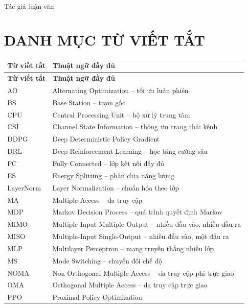 \vspace{1.2cm}
\begin{flushright}
Tác giả luận văn\\[2.2cm]
\AuthorName
\end{flushright}

\clearpage
\tableofcontents
\clearpage
\listoftables
\clearpage
\listoffigures
\clearpage

\chapter*{DANH MỤC TỪ VIẾT TẮT}
\begin{longtable}{p{2.4cm}p{11.7cm}}
\toprule
\textbf{Từ viết tắt} & \textbf{Thuật ngữ đầy đủ}\tabularnewline
\midrule
\endfirsthead
\toprule
\textbf{Từ viết tắt} & \textbf{Thuật ngữ đầy đủ}\tabularnewline
\midrule
\endhead
AO & Alternating Optimization -- tối ưu luân phiên\\
BS & Base Station -- trạm gốc\\
CPU & Central Processing Unit -- bộ xử lý trung tâm\\
CSI & Channel State Information -- thông tin trạng thái kênh\\
DDPG & Deep Deterministic Policy Gradient\\
DRL & Deep Reinforcement Learning -- học tăng cường sâu\\
FC & Fully Connected -- lớp kết nối đầy đủ\\
ES & Energy Splitting -- phân chia năng lượng\\
LayerNorm & Layer Normalization -- chuẩn hóa theo lớp\\
MA & Multiple Access -- đa truy cập\\
MDP & Markov Decision Process -- quá trình quyết định Markov\\
MIMO & Multiple-Input Multiple-Output -- nhiều đầu vào, nhiều đầu ra\\
MISO & Multiple-Input Single-Output -- nhiều đầu vào, một đầu ra\\
MLP & Multilayer Perceptron -- mạng truyền thẳng nhiều lớp\\
MS & Mode Switching -- chuyển đổi chế độ\\
NOMA & Non-Orthogonal Multiple Access -- đa truy cập phi trực giao\\
OMA & Orthogonal Multiple Access -- đa truy cập trực giao\\
PPO & Proximal Policy Optimization\\

\end{longtable}
